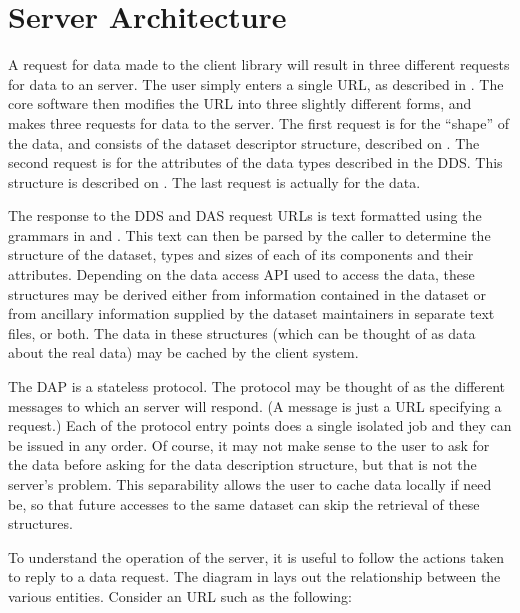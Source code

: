 \section{Server Architecture}
\label{opd-server,arch}

  A request for
data made to the client \opendap library will result in three different
requests for data to an \opendap server. The user simply enters a single
URL, as described in . The core \opendap
software then modifies the URL into three slightly different forms,
and makes three requests for data to the server. The first request is
for the ``shape'' of the data, and consists of the dataset descriptor
structure, described on . The second request is for
the attributes of the data types described in the DDS. This structure
is described on . The last request is actually for
the data.

The response to the DDS and DAS request URLs is text formatted using
the grammars in  and .
This text can then be parsed by the caller to determine the structure
of the dataset, types and sizes of each of its components and their
attributes. Depending on the data access API used to access the data,
these structures may be derived either from information contained in
the dataset or from ancillary information supplied by the dataset
maintainers in separate text files, or both.  The data in these
structures (which can be thought of as data about the real data) may
be cached by the client system.

The \opendap DAP is a stateless protocol. The protocol 
may be thought of as the different messages to which an \opendap server
will respond. (A message is just a URL specifying a request.)  Each of
the protocol entry points does a single isolated job and they can be
issued in any order. Of course, it may not make sense to the user to
ask for the data before asking for the data description structure, but
that is not the server's problem. This separability allows the user to
cache data locally if need be, so that future accesses to the same
dataset can skip the retrieval of these structures.

To understand the operation of the \opendap server, it is useful to follow
the actions taken to reply to a data request. The diagram in
 lays out the relationship
between the various entities. Consider an \opendap URL such as the
following:

